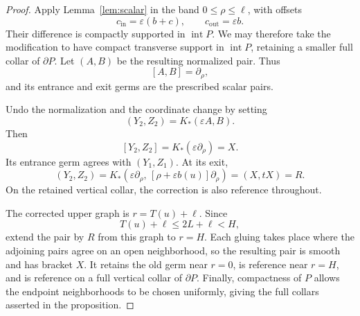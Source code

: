 \documentclass[10pt,a4paper]{amsart}
\begin{document}
\begin{proof}
Apply Lemma~\ref{lem:scalar} in the band $0\le\rho\le\ell$, with offsets
$$
    c_{\mathrm{in}}=\varepsilon(b+c),
    \qquad
    c_{\mathrm{out}}=\varepsilon b.
$$
Their difference is compactly supported in $\operatorname{int}P$. We may therefore take the modification to have compact transverse support in $\operatorname{int}P$, retaining a smaller full collar of $\partial P$. Let $(A,B)$ be the resulting normalized pair. Thus
$$
    [A,B]=\partial_\rho,
$$
and its entrance and exit germs are the prescribed scalar pairs.

Undo the normalization and the coordinate change by setting
$$
    (Y_2,Z_2)=K_*(\varepsilon A,B).
$$
Then
$$
    [Y_2,Z_2]
    =
    K_*(\varepsilon\partial_\rho)
    =
    X.
$$
Its entrance germ agrees with $(Y_1,Z_1)$. At its exit,
$$
    (Y_2,Z_2)
    =
    K_*\left(
        \varepsilon\partial_\rho,\,
        [\rho+\varepsilon b(u)]\partial_\rho
    \right)
    =
    (X,tX)=R.
$$
On the retained vertical collar, the correction is also reference throughout.

The corrected upper graph is $r=T(u)+\ell$. Since
$$
    T(u)+\ell\le 2L+\ell<H,
$$
extend the pair by $R$ from this graph to $r=H$. Each gluing takes place where the adjoining pairs agree on an open
neighborhood, so the resulting pair is smooth and has bracket $X$. It retains the old germ near $r=0$, is reference near $r=H$, and is reference on a full vertical collar of $\partial P$. Finally, compactness of $P$ allows the endpoint neighborhoods to be chosen uniformly, giving the full collars asserted in the proposition.
\end{proof}
\end{document}
